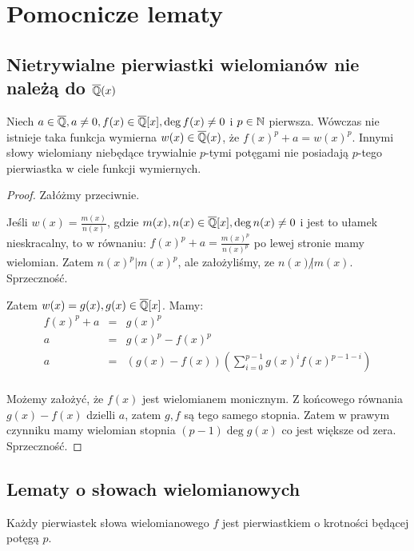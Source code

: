 \chapter{Pomocnicze lematy}
\section{Nietrywialne pierwiastki wielomianów nie należą do $\overline{\mathbb{Q}}(x)$}
\begin{lemma}
  Niech $a \in \overline{\mathbb{Q}}, a \neq 0, f(x) \in \overline{\mathbb{Q}}[x], \deg f(x)
  \neq 0$ i $p \in \mathbb{N}$ pierwsza.  Wówczas nie istnieje taka funkcja wymierna
  $w(x) \in \overline{\mathbb{Q}}(x)$, że $f(x)^{p} + a = w(x)^p$. Innymi słowy
  wielomiany niebędące trywialnie $p$-tymi potęgami nie posiadają $p$-tego
  pierwiastka w ciele funkcji wymiernych.
  \label{lem:nontrivial_roots}
\end{lemma}

\begin{proof}
Załóżmy przeciwnie.

Jeśli $w(x) = \frac{m(x)}{n(x)}$, gdzie $m(x), n(x) \in \overline{\mathbb{Q}}[x], \deg
n(x) \neq 0$ i jest to ułamek nieskracalny, to w równaniu: $f(x)^{p} + a =
\frac{m(x)^p}{n(x)^p}$ po lewej stronie mamy wielomian. Zatem $n(x)^p | m(x)^p$,
ale założyliśmy, ze $n(x) \! \not| m(x)$. Sprzeczność.

Zatem $w(x) = g(x), g(x) \in \overline{\mathbb{Q}}[x]$. Mamy:
\begin{eqnarray*}
  f(x)^p + a &=& g(x)^p \\
  a &=& g(x)^p - f(x)^p\\
  a &=& \left(g(x) - f(x)\right)\left(\sum_{i=0}^{p-1}g(x)^if(x)^{p-1 - i}\right)\\
\end{eqnarray*}

Możemy założyć, że $f(x)$ jest wielomianem monicznym. Z końcowego równania $g(x)
- f(x)$ dzielli $a$, zatem $g, f$ są tego samego stopnia. Zatem w prawym
czynniku mamy wielomian stopnia $(p-1)\deg g(x)$ co jest większe od zera.
Sprzeczność.
\end{proof}

\section{Lematy o słowach wielomianowych} 
\begin{lemma}
  Każdy pierwiastek słowa wielomianowego $f$ jest pierwiastkiem o krotności
  będącej potęgą $p$.
\end{lemma}

